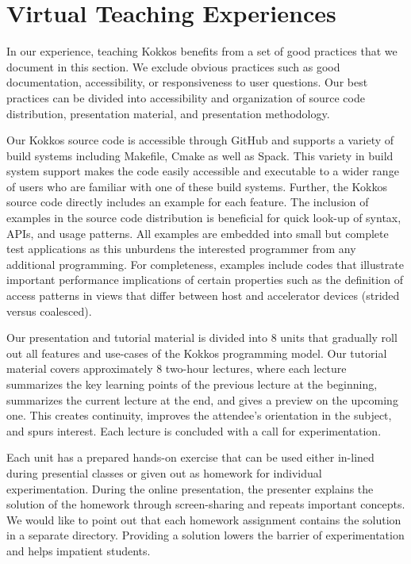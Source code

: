 \section{Virtual Teaching Experiences}\label{chap:teaching}

In our experience, teaching Kokkos benefits from a set of good practices that we document in this section. We exclude obvious practices such as good documentation, accessibility, or responsiveness to user questions. Our best practices can be divided into accessibility and organization of source code distribution, presentation material, and presentation methodology. 

Our Kokkos source code is accessible through GitHub and supports a variety of build systems including Makefile, Cmake as well as Spack\cite{SPACK}. This variety in build system support makes the code easily accessible and executable to a wider range of users who are familiar with one of these build systems. Further, the Kokkos source code directly includes an example for each feature. The inclusion of examples in the source code distribution is beneficial for quick look-up of syntax, APIs, and usage patterns. All examples are embedded into small but complete test applications as this unburdens the interested programmer from any additional programming. For completeness, examples include codes that illustrate important performance implications of certain properties such as the definition of access patterns in views that differ between host and accelerator devices (strided versus coalesced). 

Our presentation and tutorial material is divided into 8 units that gradually roll out all features and use-cases of the Kokkos programming model. Our tutorial material covers approximately 8 two-hour lectures, where each lecture summarizes the key learning points of the previous lecture at the beginning, summarizes the current lecture at the end, and gives a preview on the upcoming one. This creates continuity, improves the attendee's orientation in the subject, and spurs interest. Each lecture is concluded with a call for experimentation. 

Each unit has a prepared hands-on exercise that can be used either in-lined during presential classes or given out as homework for individual experimentation. During the online presentation, the presenter explains the solution of the homework through screen-sharing and repeats important concepts. We would like to point out that each homework assignment contains the solution in a separate directory. Providing a solution lowers the barrier of experimentation and helps impatient students.

